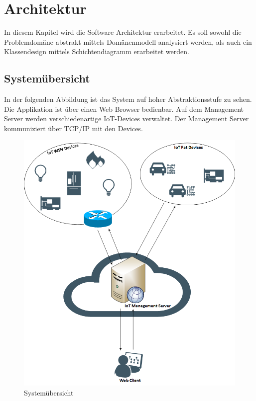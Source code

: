 \chapter{Architektur}
In diesem Kapitel wird die Software Architektur erarbeitet.  
Es soll sowohl die Problemdomäne abstrakt mittels Domänenmodell analysiert werden, als auch ein Klassendesign mittels Schichtendiagramm erarbeitet werden.

\section{Systemübersicht}
In der folgenden Abbildung ist das System auf hoher Abstraktionsstufe zu sehen. Die Applikation ist über einen Web Browser bedienbar. Auf dem Management Server werden verschiedenartige IoT-Devices verwaltet. Der Management Server kommuniziert über TCP/IP mit den Devices. 

\begin{figure}[H]
\center
\includegraphics[scale=0.6]{../03_Design/images/systemuebersicht.png}\caption{Systemübersicht}
\end{figure}

\newpage


